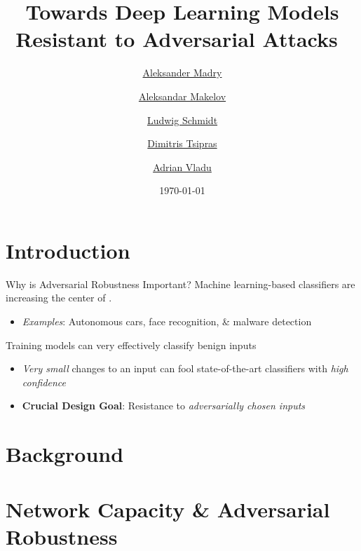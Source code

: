 \documentclass[11pt,dvipsnames,usenames,handout,aspectratio=169]{beamer}  %
\title[Towards Deep Robustness]{Towards Deep Learning Models \\ Resistant to Adversarial Attacks\texorpdfstring{~\cite{Madry:2017}}{}}
\author[Madry et al]{%
  \href{mailto:madry@mit.edu}{Aleksander Madry}\inst{1}  %
  \and
  \href{mailto:amakelov@mit.edu}{Aleksandar Makelov}\inst{1}  %
  \and
  \href{mailto:ludwigs@mit.edu}{Ludwig Schmidt}\inst{1}  %
  \and
  \href{mailto:tsipras@mit.edu}{Dimitris Tsipras}\inst{1}  %
  \and
  \href{mailto:avladu@mit.edu}{Adrian Vladu}\inst{1}  %
}
\institute[MIT]{%
  \textsuperscript{1}\textbf{MIT -- CSAIL}\\
}
\date{\today}
\renewcommand{\green}[1]{{\color{ForestGreen} #1}}
\begin{document}
\begin{frame}
  \titlepage
\end{frame}

\section{Introduction}
\begin{frame}{Why is Adversarial Robustness Important?}
  Machine learning-based classifiers are increasing the center of .
  \begin{itemize}
    \item \textit{Examples}: Autonomous cars, face recognition, \& malware detection
  \end{itemize}
  \vfill
  Training models can very effectively classify \green{benign} inputs
  \begin{itemize}
    \setlength\itemsep{6pt}
    \item \textit{Very small} changes to an input can fool state-of-the-art classifiers with \textit{high confidence}
    \item \textbf{Crucial Design Goal}: Resistance to \textit{adversarially chosen inputs}
  \end{itemize}
\end{frame}

\section{Background}










\section{Network Capacity \& Adversarial Robustness}
\end{document}
